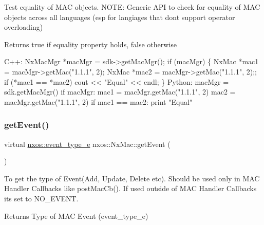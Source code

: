 Test equality of M\+AC objects. N\+O\+TE\+: Generic A\+PI to check for equality of M\+AC objects across all languages (esp for langiages that dont support operator overloading)

\begin{DoxyReturn}{Returns}
true if equality property holds, false otherwise
\end{DoxyReturn}

\begin{DoxyCode}
C++:
    NxMacMgr *macMgr = sdk->getMacMgr();
    \textcolor{keywordflow}{if} (macMgr) \{
        NxMac *mac1 = macMgr->getMac(\textcolor{stringliteral}{"1.1.1"}, 2);
        NxMac *mac2 = macMgr->getMac(\textcolor{stringliteral}{"1.1.1"}, 2);;
        \textcolor{keywordflow}{if} (*mac1 == *mac2)
            cout << \textcolor{stringliteral}{"Equal"} << endl;
    \}
Python:
    macMgr = sdk.getMacMgr()
    \textcolor{keywordflow}{if} macMgr:
       mac1 = macMgr.getMac(\textcolor{stringliteral}{"1.1.1"}, 2)
       mac2 = macMgr.getMac(\textcolor{stringliteral}{"1.1.1"}, 2)
       \textcolor{keywordflow}{if} mac1 == mac2:
          print \textcolor{stringliteral}{"Equal"}
\end{DoxyCode}
 \mbox{\label{classnxos_1_1_nx_mac_a78876af7dfe79a990ea9eacc6f6dd078}} 
\subsubsection{\texorpdfstring{get\+Event()}{getEvent()}}
{\footnotesize\ttfamily virtual \mbox{\hyperlink{namespacenxos_af9a9040b7681199d386e94eb888018cb}{nxos\+::event\+\_\+type\+\_\+e}} nxos\+::\+Nx\+Mac\+::get\+Event (\begin{DoxyParamCaption}{ }\end{DoxyParamCaption})\hspace{0.3cm}{\ttfamily [pure virtual]}}

To get the type of Event(\+Add, Update, Delete etc). Should be used only in M\+AC Handler Callbacks like post\+Mac\+Cb(). If used outside of M\+AC Handler Callbacks its set to N\+O\+\_\+\+E\+V\+E\+NT.

\begin{DoxyReturn}{Returns}
Type of M\+AC Event (event\+\_\+type\+\_\+e)
\end{DoxyReturn}

